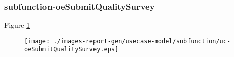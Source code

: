 \subsubsection{subfunction-oeSubmitQualitySurvey}

\label{RE-use-case-oeSubmitQualitySurvey}


Figure \ref{fig:lu.uni.lassy.excalibur.examples.icrash-RE-UCD-uc-oeSubmitQualitySurvey}

\begin{figure}[htbp]
\begin{center}

\texttt{[image: ./images-report-gen/usecase-model/subfunction/uc-oeSubmitQualitySurvey.eps]}
\end{center}
\caption[lu.uni.lassy.excalibur.examples.icrash Use Case Diagram: uc-oeSubmitQualitySurvey]{}
\label{fig:lu.uni.lassy.excalibur.examples.icrash-RE-UCD-uc-oeSubmitQualitySurvey}
\end{figure}
\vspace{0.5cm}
